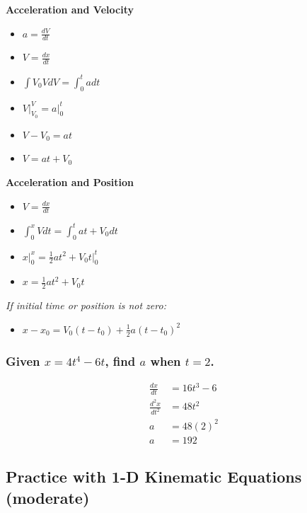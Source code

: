\documentclass[
  letterpaper,
  DIV=11,
  numbers=noendperiod]{scrartcl}
\providecommand{\tightlist}{%
  \setlength{\itemsep}{0pt}\setlength{\parskip}{0pt}}\usepackage{longtable,booktabs,array}
\begin{document}
\textbf{Acceleration and Velocity}

\begin{itemize}
\tightlist
\item
  \(a = \frac{dV}{dt}\)
\item
  \(V = \frac{dx}{dt}\)
\item
  \(\int{V_0}{V} dV = \int_{0}^{t} a dt\)
\item
  \(V\rvert_{V_0}^{V} = a\rvert_{0}^{t}\)
\item
  \(V - V_0 = at\)
\item
  \(V = at + V_0\)
\end{itemize}

\textbf{Acceleration and Position}

\begin{itemize}
\tightlist
\item
  \(V = \frac{dx}{dt}\)
\item
  \(\int_{0}^{x} V dt = \int_{0}^{t} at + V_0 dt\)
\item
  \(x\rvert_{0}^{x} = \frac{1}{2}at^2 + V_0t\rvert_{0}^{t}\)
\item
  \(x = \frac{1}{2}at^2 + V_0t\)
\end{itemize}

\emph{If initial time or position is not zero:}

\begin{itemize}
\tightlist
\item
  \(x-x_0 = V_0(t-t_0) + \frac{1}{2}a(t-t_0)^2\)
\end{itemize}

\hypertarget{given-x4t4---6t-find-a-when-t2.}{%
\subsubsection{\texorpdfstring{Given \(x=4t^4 - 6t\), find \(a\) when
\(t=2\).}{Given x=4t\^{}4 - 6t, find a when t=2.}}\label{given-x4t4---6t-find-a-when-t2.}}

\begin{align*}
\frac{dx}{dt} &= 16t^3 - 6 \\
\frac{d^2x}{dt^2} &= 48t^2 \\
a &= 48(2)^2 \\
a &= 192
\end{align*}

\hypertarget{practice-with-1-d-kinematic-equations-moderate}{%
\subsection{Practice with 1-D Kinematic Equations
(moderate)}\label{practice-with-1-d-kinematic-equations-moderate}}
\end{document}
